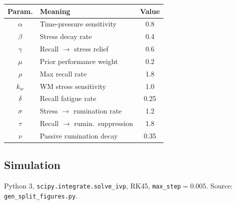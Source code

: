 \documentclass[11pt,a4paper]{article}
\begin{document}
\begin{center}
\begin{tabular}{clc}
\toprule
\textbf{Param.} & \textbf{Meaning} & \textbf{Value} \\
\midrule
$\alpha$ & Time-pressure sensitivity    & 0.8  \\
$\beta$  & Stress decay rate            & 0.4  \\
$\gamma$ & Recall $\to$ stress relief   & 0.6  \\
$\mu$    & Prior performance weight     & 0.2  \\
$\rho$   & Max recall rate              & 1.8  \\
$k_w$    & WM stress sensitivity        & 1.0  \\
$\delta$ & Recall fatigue rate          & 0.25 \\
$\sigma$ & Stress $\to$ rumination rate & 1.2  \\
$\tau$   & Recall $\to$ rumin.\ suppression & 1.8  \\
$\nu$    & Passive rumination decay     & 0.35 \\
\bottomrule
\end{tabular}
\end{center}

\subsection*{Simulation}

Python 3, \texttt{scipy.integrate.solve\_ivp}, RK45,
\texttt{max\_step}$=0.005$. Source: \texttt{gen\_split\_figures.py}.
\end{document}
